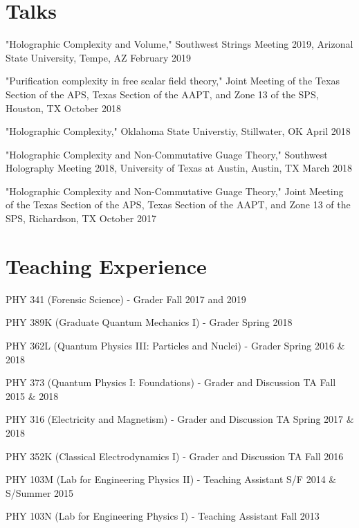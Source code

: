\documentclass[letterpaper]{article}
\renewenvironment{itemize}{
  \begin{list}{}{
    \setlength{\leftmargin}{1.5em}
  }
}{
  \end{list}
}
\begin{document}
\section*{Talks}
\begin{itemize}

\item "Holographic Complexity and Volume," Southwest Strings Meeting 2019, Arizonal State University, Tempe, AZ \hfill February 2019

\item "Purification complexity in free scalar field theory," Joint Meeting of the Texas Section of the APS, Texas Section of the AAPT, and Zone 13 of the SPS, Houston, TX \hfill October 2018

\item "Holographic Complexity," Oklahoma State Universtiy, Stillwater, OK \hfill April 2018

\item "Holographic Complexity and Non-Commutative Guage Theory," Southwest Holography Meeting 2018, University of Texas at Austin, Austin, TX \hfill March 2018

\item "Holographic Complexity and Non-Commutative Guage Theory," Joint Meeting of the Texas Section of the APS, Texas Section of the AAPT, and Zone 13 of the SPS, Richardson, TX \hfill October 2017

\end{itemize}

\section*{Teaching Experience}
\begin{itemize}

\item PHY 341 (Forensic Science) - Grader \hfill Fall 2017 and 2019

\item PHY 389K (Graduate Quantum Mechanics I) - Grader \hfill{Spring 2018}

\item PHY 362L (Quantum Physics III: Particles and Nuclei) - Grader \hfill{Spring 2016 \& 2018}

\item PHY 373 (Quantum Physics I: Foundations) - Grader and Discussion TA \hfill{Fall 2015 \& 2018}

\item PHY 316 (Electricity and Magnetism) - Grader and Discussion TA \hfill Spring 2017 \& 2018

\item PHY 352K (Classical Electrodynamics I) - Grader and Discussion TA \hfill Fall 2016

\item PHY 103M (Lab for Engineering Physics II) - Teaching Assistant \hfill {S/F 2014 \& S/Summer 2015}

\item PHY 103N (Lab for Engineering Physics I) - Teaching Assistant \hfill {Fall 2013}

\end{itemize}
\end{document}
